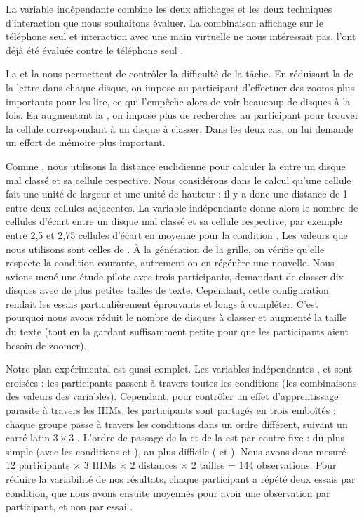 La variable indépendante  combine les deux affichages et les deux techniques d'interaction que nous souhaitons évaluer. La combinaison affichage sur le téléphone seul et interaction avec une main virtuelle ne nous intéressait pas. \cite{Jones2012} l'ont déjà été évaluée contre le téléphone seul .

La  et la  nous permettent de contrôler la difficulté de la tâche. En réduisant la  de la lettre dans chaque disque, on impose au participant d'effectuer des zooms plus importants pour les lire, ce qui l'empêche alors de voir beaucoup de disques à la fois. En augmentant la , on impose plus de recherches au participant pour trouver la cellule correspondant à un disque à classer. Dans les deux cas, on lui demande un effort de mémoire plus important.

Comme \citeauthor{Liu2014}, nous utilisons la distance euclidienne pour calculer la  entre un disque mal classé et sa cellule respective. Nous considérons dans le calcul qu'une cellule fait une unité de largeur et une unité de hauteur : il y a donc une distance de 1 entre deux cellules adjacentes. La variable indépendante donne alors le nombre de cellules d'écart entre un disque mal classé et sa cellule respective, par exemple entre 2,5 et 2,75 cellules d'écart en moyenne pour la condition . Les valeurs que nous utilisons sont celles de \cite{Liu2014}. À la génération de la grille, on vérifie qu'elle respecte la condition courante, autrement on en régénère une nouvelle. Nous avions mené une étude pilote avec trois participants, demandant de classer dix disques avec de plus petites tailles de texte. Cependant, cette configuration rendait les essais particulièrement éprouvants et longs à compléter. C'est pourquoi nous avons réduit le nombre de disques à classer et augmenté la taille du texte (tout en la gardant suffisamment petite pour que les participants aient besoin de zoomer).

Notre plan expérimental est quasi complet. Les variables indépendantes ,  et  sont croisées : les participants passent à travers toutes les conditions (les combinaisons des valeurs des variables). Cependant, pour contrôler un effet d'apprentissage parasite à travers les IHMs, les participants sont partagés en trois  emboîtés : chaque groupe passe à travers les conditions  dans un ordre différent, suivant un carré latin $3 \times 3$ . L'ordre de passage de la  et de la  est par contre fixe : du plus simple (avec les conditions  et ), au plus difficile ( et ). Nous avons donc mesuré 12 participants $\times$ 3 IHMs $\times$ 2 distances $\times$ 2 tailles = 144 observations. Pour réduire la variabilité de nos résultats, chaque participant a répété deux essais par condition, que nous avons ensuite moyennés pour avoir une observation par participant, et non par essai \citep[p. 24]{Dragicevic2016}.

